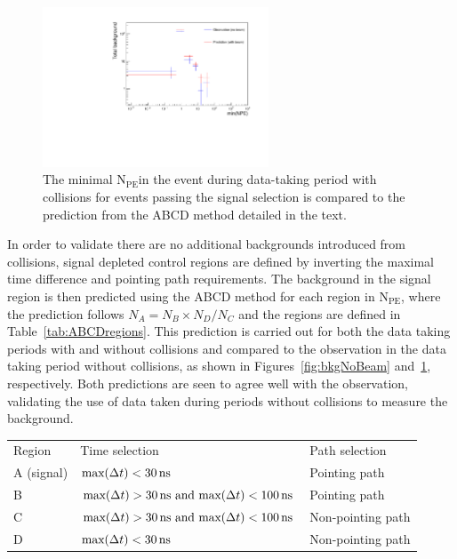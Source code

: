 \documentclass[12pt]{article}
\newcommand{\unit}[1]{\ensuremath{\text{\,#1}}\xspace}
\newcommand{\npe} {\mbox{\ensuremath{\textrm{N}_\textrm{PE}}\xspace}}
\begin{document}
\begin{figure}[ht!]
    \centering
    \includegraphics[width=0.6\textwidth]{figures/backgroundYieldsWithBeam_15ns_07}
    \caption{\label{fig:bkgWithBeam} The minimal \npe in the event during data-taking period with 
    collisions for events passing the signal selection is
    compared to the prediction from the ABCD method detailed in the text.}
\end{figure}

In order to validate there are no additional backgrounds introduced from collisions, signal depleted
control regions are defined by inverting the maximal time difference and pointing path requirements.
The background in the signal region is then predicted using the ABCD method for each region
in \npe, where the prediction follows $N_A = N_B\times N_D/N_C$ and the regions are defined in Table~\ref{tab:ABCDregions}. 
This prediction is carried out for both the data taking periods with and without collisions and compared
to the observation in the data taking period without collisions, as shown in Figures~\ref{fig:bkgNoBeam} 
and~\ref{fig:bkgWithBeam}, respectively. Both predictions are seen to agree well with the observation, 
validating the use of data taken during periods without collisions to measure the background.

\begin{table}
    \centering
    \scriptsize
    \begin{tabular}{lll}
	Region& Time selection & Path selection\\
	A (signal) & $\text{max}(\Delta t) < 30 \unit{ns}$ & Pointing path\\
	B & $\text{max}(\Delta t) > 30 \unit{ns} \text{ and } \text{max}(\Delta t) < 100 \unit{ns}$ & Pointing path\\
	C & $\text{max}(\Delta t) > 30 \unit{ns} \text{ and } \text{max}(\Delta t) < 100 \unit{ns}$ & Non-pointing path\\
	D &$\text{max}(\Delta t) < 30\unit{ns}$ & Non-pointing path\\
    \end{tabular}
\end{table}
\end{document}
